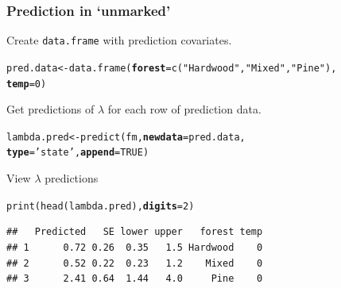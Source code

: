 \documentclass[color=usenames,dvipsnames]{beamer}\usepackage[]{graphicx}\usepackage[]{xcolor}
\makeatletter
\newcommand{\hlnum}[1]{\textcolor[rgb]{0.69,0.494,0}{#1}}%
\newcommand{\hlsng}[1]{\textcolor[rgb]{0.749,0.012,0.012}{#1}}%
\newcommand{\hldef}[1]{\textcolor[rgb]{0,0,0}{#1}}%
\newcommand{\hlkwb}[1]{\textcolor[rgb]{0,0.341,0.682}{#1}}%
\newcommand{\hlkwc}[1]{\textcolor[rgb]{0,0,0}{\textbf{#1}}}%
\newcommand{\hlkwd}[1]{\textcolor[rgb]{0.004,0.004,0.506}{#1}}%
\newenvironment{kframe}{%
 \def\at@end@of@kframe{}%
 \ifinner\ifhmode%
  \def\at@end@of@kframe{\end{minipage}}%
  \begin{minipage}{\columnwidth}%
 \fi\fi%
 \def\FrameCommand##1{\hskip\@totalleftmargin \hskip-\fboxsep
 \colorbox{shadecolor}{##1}\hskip-\fboxsep
     \hskip-\linewidth \hskip-\@totalleftmargin \hskip\columnwidth}%
 \MakeFramed {\advance\hsize-\width
   \@totalleftmargin\z@ \linewidth\hsize
   \@setminipage}}%
 {\par\unskip\endMakeFramed%
 \at@end@of@kframe}
\newenvironment{knitrout}{}{} %
\makeatother
\begin{document}
\begin{frame}[fragile]
  \frametitle{Prediction in `unmarked'}
  \small
  Create \texttt{data.frame} with prediction covariates. 
  \vspace{-6pt}
\begin{knitrout}\footnotesize
{}\color{fgcolor}\begin{kframe}
\begin{alltt}
\hldef{pred.data} \hlkwb{<-} \hlkwd{data.frame}\hldef{(}\hlkwc{forest}\hldef{=}\hlkwd{c}\hldef{(}\hlsng{"Hardwood"}\hldef{,} \hlsng{"Mixed"}\hldef{,} \hlsng{"Pine"}\hldef{),}
                        \hlkwc{temp}\hldef{=}\hlnum{0}\hldef{)}
\end{alltt}
\end{kframe}
\end{knitrout}
\pause
\vfill
Get predictions of $\lambda$ for each row of prediction data.
  \vspace{-6pt}
\begin{knitrout}\footnotesize
{}\color{fgcolor}\begin{kframe}
\begin{alltt}
\hldef{lambda.pred} \hlkwb{<-} \hlkwd{predict}\hldef{(fm,} \hlkwc{newdata}\hldef{=pred.data,}
                       \hlkwc{type}\hldef{=}\hlsng{'state'}\hldef{,} \hlkwc{append}\hldef{=}\hlnum{TRUE}\hldef{)}
\end{alltt}
\end{kframe}
\end{knitrout}
\pause
\vfill
  View $\lambda$ predictions
  \vspace{-6pt}
\begin{knitrout}\footnotesize
{}\color{fgcolor}\begin{kframe}
\begin{alltt}
\hlkwd{print}\hldef{(}\hlkwd{head}\hldef{(lambda.pred),} \hlkwc{digits}\hldef{=}\hlnum{2}\hldef{)}
\end{alltt}
\begin{verbatim}
##   Predicted   SE lower upper   forest temp
## 1      0.72 0.26  0.35   1.5 Hardwood    0
## 2      0.52 0.22  0.23   1.2    Mixed    0
## 3      2.41 0.64  1.44   4.0     Pine    0
\end{verbatim}
\end{kframe}
\end{knitrout}
\end{frame}
\end{document}
